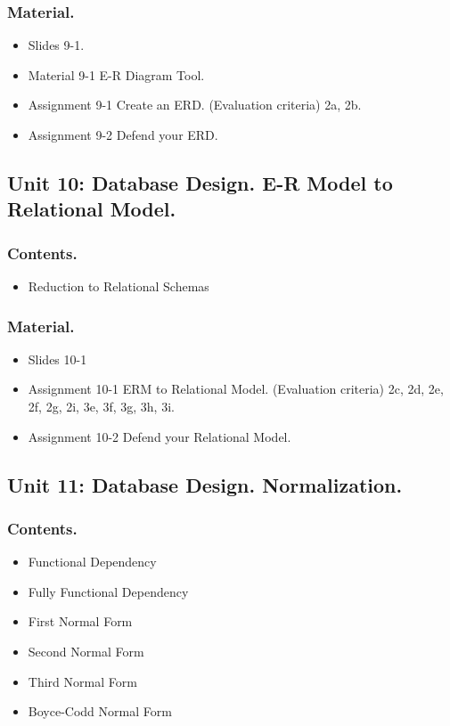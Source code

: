 \documentclass[catalan, a4paper, 12pt, titlepage]{article}
\begin{document}
  \subsubsection{Material.}
  \begin{itemize}
	  \item Slides 9-1.
	  \item Material 9-1 E-R Diagram Tool.
	  \item Assignment 9-1 Create an ERD. (\faGraduationCap Evaluation criteria) 2a, 2b.
	  \item Assignment 9-2 Defend your ERD.
  \end{itemize}


  \subsection{Unit 10: Database Design. E-R Model to Relational Model.}

  \subsubsection{Contents.}
  \begin{itemize}
	\item Reduction to Relational Schemas
  \end{itemize}

  \subsubsection{Material.}
  \begin{itemize}
	  \item Slides 10-1
	  \item Assignment 10-1 ERM to Relational Model. (\faGraduationCap Evaluation criteria) 2c, 2d, 2e, 2f, 2g, 2i, 3e, 3f, 3g, 3h, 3i.
	  \item Assignment 10-2 Defend your Relational Model.
  \end{itemize}

  \subsection{Unit 11: Database Design. Normalization.}

  \subsubsection{Contents.}
  \begin{itemize}
	\item Functional Dependency
	\item Fully Functional Dependency
	\item First Normal Form
	\item Second Normal Form
	\item Third Normal Form
	\item Boyce-Codd Normal Form
  \end{itemize}
\end{document}
